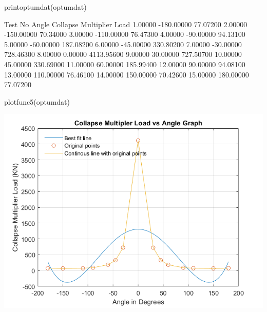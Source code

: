 \documentclass{article}
\begin{document}
\begin{matlabcode}
printoptumdat(optumdat)
\end{matlabcode}
\begin{matlaboutput}
       Test No                 Angle         Collapse Multiplier Load
        1.00000              -180.00000                77.07200
        2.00000              -150.00000                70.34000
        3.00000              -110.00000                76.47300
        4.00000               -90.00000                94.13100
        5.00000               -60.00000               187.08200
        6.00000               -45.00000               330.80200
        7.00000               -30.00000               728.46300
        8.00000                 0.00000              4113.95600
        9.00000                30.00000               727.50700
       10.00000                45.00000               330.69000
       11.00000                60.00000               185.99400
       12.00000                90.00000                94.08100
       13.00000               110.00000                76.46100
       14.00000               150.00000                70.42600
       15.00000               180.00000                77.07200
\end{matlaboutput}


\vspace{1em}
\label{H_2FA13FBB}
\begin{matlabcode}
plotfunc5(optumdat)
\end{matlabcode}
\begin{center}
\includegraphics[width=\maxwidth{56.196688409433015em}]{figure_3}
\end{center}
\end{document}
